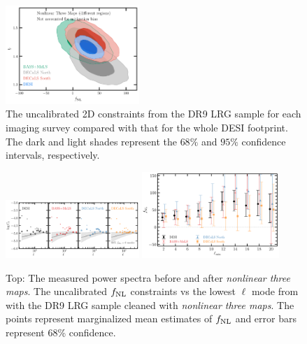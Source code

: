 \begin{figure}
    \centering
    \includegraphics[width=0.45\textwidth]{figures/mcmc_dr9regions.pdf} 
    \caption{The uncalibrated 2D constraints from the DR9 LRG sample for each imaging survey compared with that for the whole DESI footprint. The dark and light shades represent the $68\%$ and $95\%$ confidence intervals, respectively.}\label{fig:mcmc_dr9reg}
\end{figure}
\begin{figure}
    \centering
    \includegraphics[width=0.45\textwidth]{figures/cldr9_lowell.pdf}
    \includegraphics[width=0.46\textwidth]{figures/fnl_elmin.pdf}  
    \caption{Top: The measured power spectra before and after \textit{nonlinear three maps}. The uncalibrated $f_{\rm NL}$ constraints vs the lowest $\ell$ mode from with the DR9 LRG sample cleaned with \textit{nonlinear three maps}. The points represent marginalized mean estimates of $f_{\rm NL}$ and error bars represent $68$\% confidence.}\label{fig:mcmc_dr9elmin}
\end{figure}

